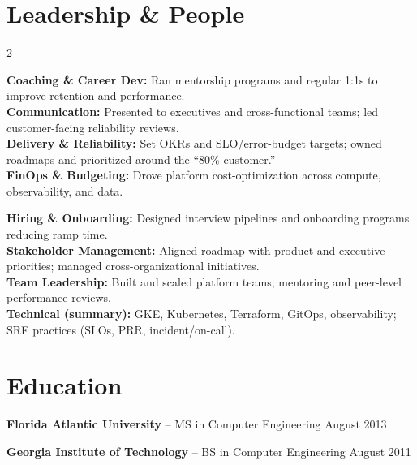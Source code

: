 \documentclass[11pt]{article}
\begin{document}
\section*{Leadership \& People}
\begin{multicols}{2}
\begin{flushleft}
\parbox{\linewidth}{\raggedright
  \textbf{Coaching \& Career Dev:} Ran mentorship programs and regular 1:1s to improve retention and performance.\\
  \textbf{Communication:} Presented to executives and cross-functional teams; led customer-facing reliability reviews.\\
  \textbf{Delivery \& Reliability:} Set OKRs and SLO/error-budget targets; owned roadmaps and prioritized around the ``80\% customer.''\\
  \textbf{FinOps \& Budgeting:} Drove platform cost-optimization across compute, observability, and data.\\
}
\end{flushleft}
\begin{flushright}
\parbox{\linewidth}{\raggedleft
  \textbf{Hiring \& Onboarding:} Designed interview pipelines and onboarding programs reducing ramp time.\\
  \textbf{Stakeholder Management:} Aligned roadmap with product and executive priorities; managed cross-organizational initiatives.\\
  \textbf{Team Leadership:} Built and scaled platform teams; mentoring and peer-level performance reviews.\\
  \textbf{Technical (summary):} GKE, Kubernetes, Terraform, GitOps, observability; SRE practices (SLOs, PRR, incident/on-call).\\
}
\end{flushright}
\end{multicols}

\vspace{-18.5pt}

\section*{Education}
\begin{description}
\item\textbf{Florida Atlantic University} -- MS in Computer Engineering \hfill August 2013
\vspace{-9.5pt}
\item\textbf{Georgia Institute of Technology} -- BS in Computer Engineering \hfill August 2011
\end{description}
\end{document}
